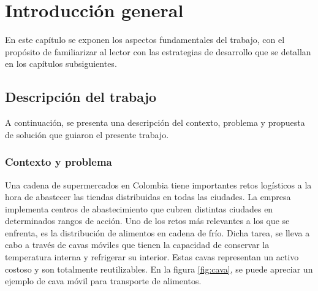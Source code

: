 
\chapter{Introducción general} %

\label{Chapter1} %
\label{IntroGeneral}

En este capítulo se exponen los aspectos fundamentales del trabajo, con el propósito de familiarizar al lector con las estrategias de desarrollo que se detallan en los capítulos subsiguientes.


\newcommand{\keyword}[1]{\textbf{#1}}
\newcommand{\tabhead}[1]{\textbf{#1}}
\newcommand{\code}[1]{\texttt{#1}}
\newcommand{\file}[1]{\texttt{\bfseries#1}}
\newcommand{\option}[1]{\texttt{\itshape#1}}
\newcommand{\grados}{$^{\circ}$}




\section{Descripción del trabajo}
\label{sec:desc_general}

A continuación, se presenta una descripción del contexto, problema y propuesta de solución que guiaron el presente trabajo.

\subsection{Contexto y problema}

Una cadena de supermercados en Colombia tiene importantes retos logísticos a la hora de abastecer las tiendas distribuidas en todas las ciudades. La empresa implementa centros de abastecimiento que cubren distintas ciudades en determinados rangos de acción. Uno de los retos más relevantes a los que se enfrenta, es la distribución de alimentos en cadena de frío. Dicha tarea, se lleva a cabo a través de cavas móviles que tienen la capacidad de conservar la temperatura interna y refrigerar su interior. Estas cavas representan un activo costoso y son totalmente reutilizables. En la figura \ref{fig:cava}, se puede apreciar un ejemplo de cava móvil para transporte de alimentos. 

